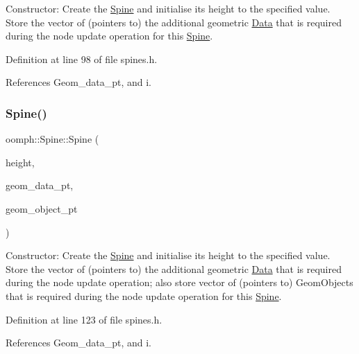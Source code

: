 Constructor\+: Create the \hyperlink{classoomph_1_1Spine}{Spine} and initialise its height to the specified value. Store the vector of (pointers to) the additional geometric \hyperlink{classoomph_1_1Data}{Data} that is required during the node update operation for this \hyperlink{classoomph_1_1Spine}{Spine}. 



Definition at line 98 of file spines.\+h.



References Geom\+\_\+data\+\_\+pt, and i.

\mbox{\label{classoomph_1_1Spine_a482bd3c74deddb27c1c7ce2e4eb6ae42}} 
\subsubsection{\texorpdfstring{Spine()}{Spine()}\hspace{0.1cm}{\footnotesize\ttfamily [4/4]}}
{\footnotesize\ttfamily oomph\+::\+Spine\+::\+Spine (\begin{DoxyParamCaption}\item[{const double \&}]{height,  }\item[{const \hyperlink{classoomph_1_1Vector}{Vector}$<$ \hyperlink{classoomph_1_1Data}{Data} $\ast$$>$ \&}]{geom\+\_\+data\+\_\+pt,  }\item[{const \hyperlink{classoomph_1_1Vector}{Vector}$<$ \hyperlink{classoomph_1_1GeomObject}{Geom\+Object} $\ast$$>$ \&}]{geom\+\_\+object\+\_\+pt }\end{DoxyParamCaption})\hspace{0.3cm}{\ttfamily [inline]}}



Constructor\+: Create the \hyperlink{classoomph_1_1Spine}{Spine} and initialise its height to the specified value. Store the vector of (pointers to) the additional geometric \hyperlink{classoomph_1_1Data}{Data} that is required during the node update operation; also store vector of (pointers to) Geom\+Objects that is required during the node update operation for this \hyperlink{classoomph_1_1Spine}{Spine}. 



Definition at line 123 of file spines.\+h.



References Geom\+\_\+data\+\_\+pt, and i.

